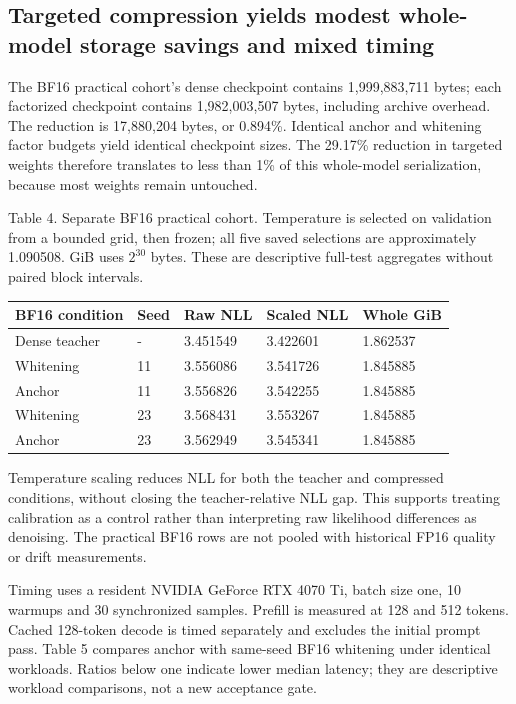 \documentclass[conference]{IEEEtran}
\begin{document}
\subsection{Targeted compression yields modest whole-model storage savings and mixed timing}
The BF16 practical cohort's dense checkpoint contains 1,999,883,711 bytes; each factorized checkpoint contains 1,982,003,507 bytes, including archive overhead. The reduction is 17,880,204 bytes, or 0.894\%. Identical anchor and whitening factor budgets yield identical checkpoint sizes. The 29.17\% reduction in targeted weights therefore translates to less than 1\% of this whole-model serialization, because most weights remain untouched.\par\smallskip
Table 4. Separate BF16 practical cohort. Temperature is selected on validation from a bounded grid, then frozen; all five saved selections are approximately 1.090508. GiB uses $2^{30}$ bytes. These are descriptive full-test aggregates without paired block intervals.\par\smallskip
{\scriptsize\setlength{\tabcolsep}{2pt}
\noindent\begin{tabular}{@{}p{}p{}p{}p{}p{}@{}}\toprule
BF16 condition & Seed & Raw NLL & Scaled NLL & Whole GiB \\
\midrule
Dense teacher & - & 3.451549 & 3.422601 & 1.862537 \\
Whitening & 11 & 3.556086 & 3.541726 & 1.845885 \\
Anchor & 11 & 3.556826 & 3.542255 & 1.845885 \\
Whitening & 23 & 3.568431 & 3.553267 & 1.845885 \\
Anchor & 23 & 3.562949 & 3.545341 & 1.845885 \\
\bottomrule\end{tabular}}\par\medskip
Temperature scaling reduces NLL for both the teacher and compressed conditions, without closing the teacher-relative NLL gap. This supports treating calibration as a control rather than interpreting raw likelihood differences as denoising. The practical BF16 rows are not pooled with historical FP16 quality or drift measurements.\par\smallskip
Timing uses a resident NVIDIA GeForce RTX 4070 Ti, batch size one, 10 warmups and 30 synchronized samples. Prefill is measured at 128 and 512 tokens. Cached 128-token decode is timed separately and excludes the initial prompt pass. Table 5 compares anchor with same-seed BF16 whitening under identical workloads. Ratios below one indicate lower median latency; they are descriptive workload comparisons, not a new acceptance gate.\par\smallskip
\end{document}
